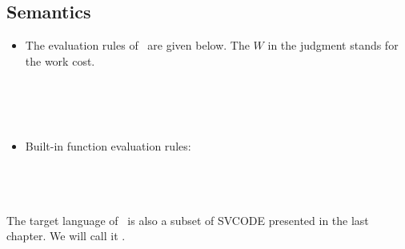 \subsection{Semantics}


\begin{itemize}
\item The evaluation rules of \fmsnesl \ are  given below. The $W$ in the judgment stands for the work cost. \\

	
	
	\\[2ex]	
	\\[2ex]
	
	\\
	
\item Built-in function evaluation rules: \\

	
	 \\[2ex]
	
	
\end{itemize}


\section{\fmsvcode}
The target language of \fmsnesl \  is also a subset of SVCODE presented in the last chapter. 
We will call it  \fmsvcode.

